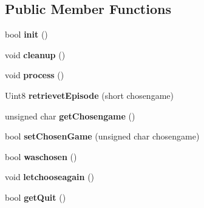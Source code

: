 \subsection*{Public Member Functions}
\begin{DoxyCompactItemize}
\item 
\hypertarget{class_c_game_launcher_a09e54c7bcc3ff0c1f593b394b50e2035}{
bool {\bfseries init} ()}
\label{class_c_game_launcher_a09e54c7bcc3ff0c1f593b394b50e2035}

\item 
\hypertarget{class_c_game_launcher_a19d66bea571e12f63b846d2ba0cb804b}{
void {\bfseries cleanup} ()}
\label{class_c_game_launcher_a19d66bea571e12f63b846d2ba0cb804b}

\item 
\hypertarget{class_c_game_launcher_af2ebcc80aa954cecce8f1516d2a73803}{
void {\bfseries process} ()}
\label{class_c_game_launcher_af2ebcc80aa954cecce8f1516d2a73803}

\item 
\hypertarget{class_c_game_launcher_a5d5e16a6738c998c9cd525272c137014}{
Uint8 {\bfseries retrievetEpisode} (short chosengame)}
\label{class_c_game_launcher_a5d5e16a6738c998c9cd525272c137014}

\item 
\hypertarget{class_c_game_launcher_afb03af86a8c00fca0a430e6b8b5e91e0}{
unsigned char {\bfseries getChosengame} ()}
\label{class_c_game_launcher_afb03af86a8c00fca0a430e6b8b5e91e0}

\item 
\hypertarget{class_c_game_launcher_a385a7c999ecce4d0727ba02ead0341c8}{
bool {\bfseries setChosenGame} (unsigned char chosengame)}
\label{class_c_game_launcher_a385a7c999ecce4d0727ba02ead0341c8}

\item 
\hypertarget{class_c_game_launcher_a7f4dab53ef4677790993cc804b06d41a}{
bool {\bfseries waschosen} ()}
\label{class_c_game_launcher_a7f4dab53ef4677790993cc804b06d41a}

\item 
\hypertarget{class_c_game_launcher_aa0221821dfdfcf50e12f86c3dc8fafd3}{
void {\bfseries letchooseagain} ()}
\label{class_c_game_launcher_aa0221821dfdfcf50e12f86c3dc8fafd3}

\item 
\hypertarget{class_c_game_launcher_a345b160f23f9ea5ffdc95cb056512a38}{
bool {\bfseries getQuit} ()}
\label{class_c_game_launcher_a345b160f23f9ea5ffdc95cb056512a38}


\end{DoxyCompactItemize}
